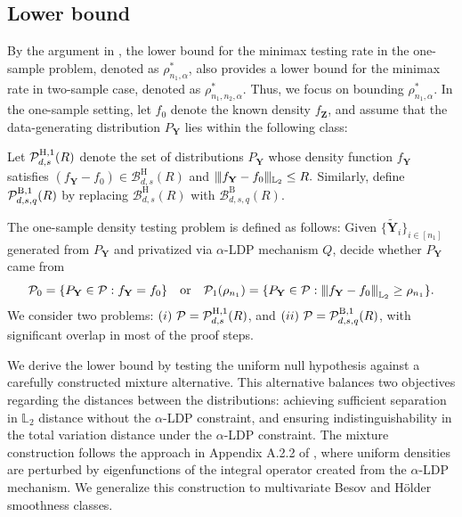 \documentclass[twoside,11pt]{article}
\newcommand{\distClassGeneric}{\mathcal{P}}
\newcommand{\Ell}{\mathbb{L}}
\newcommand{\EllTwo}{\Ell_2} %
\newcommand{\normEllp}[3]{
	\vertiii{#1}_{\Ell_{#2}}^{#3}
}
\newcommand{\vertiii}[1]{
	{\left\vert\kern-0.25ex\left\vert\kern-0.25ex\left\vert #1 
		\right\vert\kern-0.25ex\right\vert\kern-0.25ex\right\vert}
}%
\newcommand{\rvTwo}{Y}
\newcommand{\rvThree}{Z}
\newcommand{\vectorize}[1]{\mathbf{#1}}
\newcommand{\sampleIndexOne}{i}
\newcommand{\sampleSets}[3]{\{{#1}_{#2}\}_{#2 \in [#3]}}
\newcommand{\dimDensity}{d} %
\newcommand{\sampleSize}{n}
\newcommand{\smoothness}{s}
\newcommand{\privacyMechanism}{Q}
\newcommand{\ballRadius}{R}
\newcommand{\privacyParameter}{\alpha} %
\newcommand{\separation}{\rho} %
\newcommand{\besovParamMicroscope}{q}
\newcommand{\ballDistn}{\mathcal{B}}
\newcommand{\besovBall}[2]{\ballDistn_{\dimDensity,\smoothness, #2}^{\mathrm{B}}(\ballRadius)}
\newcommand{\holderBall}{\ballDistn_{\dimDensity, \smoothness}^{\mathrm{H}}(\ballRadius)} %
\newcommand{\pBesovGof}{ %
	\distClassGeneric_{%
		\dimDensity, \smoothness, \besovParamMicroscope
	}^{%
		\mathrm{B,1}
	}
	(\ballRadius)
}
\newcommand{\pHolderGof}{ %
	\distClassGeneric_{%
		\dimDensity, \smoothness
	}^{%
		\mathrm{H,1}
	}
	(\ballRadius)
}
\begin{document}
\begin{appendix}
	\subsection{Lower bound}\label{proof:twosample_conti_lower_bound}
	By the argument in \citet{Arias-Castro2018RememberDimension}, the lower bound for the minimax testing rate in the one-sample problem, denoted as $\separation^\ast_{n_1, \privacyParameter}$, also provides a lower bound for the minimax rate in two-sample case, denoted as $\separation^\ast_{n_1, n_2, \privacyParameter}$. 
	Thus, we focus on bounding $\separation^\ast_{n_1, \privacyParameter}$.
	In the one-sample setting,
	let $f_0$ denote the  known density $f_{\vectorize{\rvThree}}$, and assume that the data-generating distribution $P_{\vectorize{Y}}$ lies within the following class:
	\begin{definition}\label{def:smooth_distribution_class_gof}
		Let $\pHolderGof$ denote the set of distributions $P_{\vectorize{Y}}$ whose density function $f_{\vectorize{Y}}$ satisfies $(f_{\vectorize{\rvTwo}} - f_0) \in \holderBall$ and
		$
		\vert\kern-0.25ex \vert\kern-0.25ex \vert f_{\vectorize{\rvTwo}} - f_0 \vert\kern-0.25ex \vert\kern-0.25ex \vert_{\EllTwo} \leq \ballRadius.
		$
		Similarly, define $\pBesovGof$ by replacing $\holderBall$ with $\besovBall{2}{\besovParamMicroscope}$.
	\end{definition}
	\noindent
	The one-sample density testing problem is defined as follows: 
	Given  $\sampleSets{\tilde{\vectorize{\rvTwo}}}{\sampleIndexOne}{\sampleSize_1}$ generated from $P_{\vectorize{Y}}$ and privatized via $\privacyParameter$-LDP mechanism $\privacyMechanism$, decide whether $P_{\vectorize{Y}}$ came from
	\begin{equation}\label{one_sample_hypothesis}
		\distClassGeneric_0 = \{ P_{\vectorize{Y}} \in \distClassGeneric : f_{\vectorize{Y}} = f_0 \}
		\quad \text{or} \quad
		\distClassGeneric_1(\rho_{n_1}) = \{ P_{\vectorize{Y}} \in \distClassGeneric : \normEllp{f_{\vectorize{Y}} - f_0}{2}{} \geq \rho_{n_1} \}.  
	\end{equation}
	We consider two problems: $(i)~\distClassGeneric = \pHolderGof$, and $(ii)~\distClassGeneric = \pBesovGof$, with significant overlap in most of the proof steps.
	
	We derive the lower bound by testing the uniform null hypothesis against a carefully constructed mixture alternative. This alternative balances two objectives regarding the distances between the distributions: achieving sufficient separation in \(\EllTwo\) distance without the \(\privacyParameter\)-LDP constraint, and ensuring indistinguishability in the total variation distance under the \(\privacyParameter\)-LDP constraint.
	The mixture construction follows the approach in Appendix A.2.2 of \citet{Lam-Weil2021MinimaxConstraint}, where uniform densities are perturbed by eigenfunctions of the integral operator created from the $\privacyParameter$-LDP mechanism. We generalize this construction to multivariate Besov and H\"{o}lder smoothness classes.
	

\end{appendix}
\end{document}
